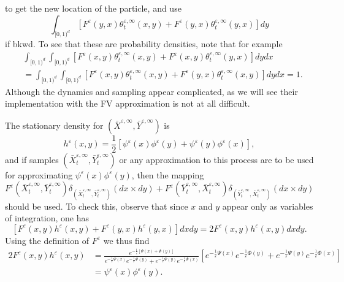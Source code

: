 \documentclass[english,11pt]{article}%
\numberwithin{equation}{section}
\numberwithin{example}{section}
\numberwithin{theorem}{section}
\begin{document}
to get the new location of the particle, and use
\[
\int_{\lbrack0,1)^{d}}\left[  F^{\varepsilon}(y,x)\theta_{t}^{\varepsilon
,\infty}(x,y)+F^{\varepsilon}(y,x)\theta_{t}^{\varepsilon,\infty}(y,x)\right]
dy
\]
if bkwd. To see that these are probability densities, note that for example
\begin{align*}
&  \int_{[0,1)^{d}}\int_{[0,1)^{d}}\left[  F^{\varepsilon}(x,y)\theta
_{t}^{\varepsilon,\infty}(x,y)+F^{\varepsilon}(x,y)\theta_{t}^{\varepsilon
,\infty}(y,x)\right]  dydx\\
&  =\int_{[0,1)^{d}}\int_{[0,1)^{d}}\left[  F^{\varepsilon}(x,y)\theta
_{t}^{\varepsilon,\infty}(x,y)+F^{\varepsilon}(y,x)\theta_{t}^{\varepsilon
,\infty}(x,y)\right]  dydx=1.
\end{align*}
Although the dynamics and sampling appear complicated, as we will see their
implementation with the FV approximation is not at all difficult.

The stationary density for $(\bar{X}^{\varepsilon,\infty},\bar{Y}%
^{\varepsilon,\infty})$ is
\[
h^{\varepsilon}(x,y)=\frac{1}{2}\left[  \psi^{\varepsilon}(x)\phi
^{\varepsilon}(y)+\psi^{\varepsilon}(y)\phi^{\varepsilon}(x)\right]  ,
\]
and if samples $(\bar{X}_{t}^{\varepsilon,\infty},\bar{Y}_{t}^{\varepsilon
,\infty})$ or any approximation to this process are to be used for
approximating $\psi^{\varepsilon}(x)\phi^{\varepsilon}(y)$, then the mapping
\[
F^{\varepsilon}(\bar{X}_{t}^{\varepsilon,\infty},\bar{Y}_{t}^{\varepsilon
,\infty})\delta_{(\bar{X}_{t}^{\varepsilon,\infty},\bar{Y}_{t}^{\varepsilon
,\infty})}(dx\times dy)+F^{\varepsilon}(\bar{Y}_{t}^{\varepsilon,\infty}%
,\bar{X}_{t}^{\varepsilon,\infty})\delta_{(\bar{Y}_{t}^{\varepsilon,\infty
},\bar{X}_{t}^{\varepsilon,\infty})}(dx\times dy)
\]
should be used. To check this, observe that since $x$ and $y$ appear only as
variables of integration, one has%
\[
\left[  F^{\varepsilon}(x,y)h^{\varepsilon}(x,y)+F^{\varepsilon}%
(y,x)h^{\varepsilon}(y,x)\right]  dxdy=2F^{\varepsilon}(x,y)h^{\varepsilon
}(x,y)dxdy.
\]
Using the definition of $F^{\varepsilon}$ we thus find%
\begin{align*}
2F^{\varepsilon}(x,y)h^{\varepsilon}(x,y)  &  =\frac{e^{-\frac{1}{\varepsilon
}\left[  \Psi(x)+\Phi(y)\right]  }}{e^{-\frac{1}{\varepsilon}\Psi(x)}%
e^{-\frac{1}{\varepsilon}\Phi(y)}+e^{-\frac{1}{\varepsilon}\Psi(y)}%
e^{-\frac{1}{\varepsilon}\Phi(x)}}\left[  e^{-\frac{1}{\varepsilon}\Psi
(x)}e^{-\frac{1}{\varepsilon}\Phi(y)}+e^{-\frac{1}{\varepsilon}\Psi
(y)}e^{-\frac{1}{\varepsilon}\Phi(x)}\right] \\
&  =\psi^{\varepsilon}(x)\phi^{\varepsilon}(y).
\end{align*}
\end{document}
